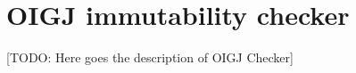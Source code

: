\htmlhr
\chapter{OIGJ immutability checker\label{oigj-checker}}

[TODO: Here goes the description of OIGJ Checker]


